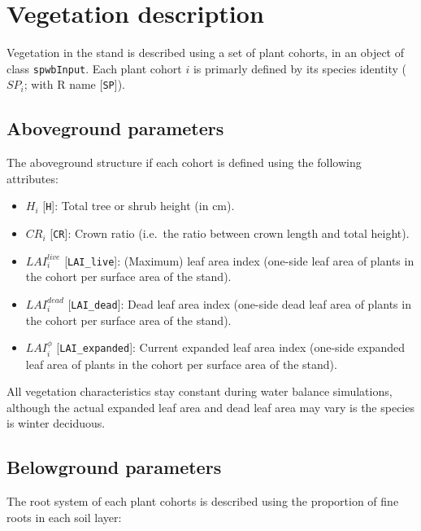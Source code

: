 \documentclass[]{book}
\providecommand{\tightlist}{%
  \setlength{\itemsep}{0pt}\setlength{\parskip}{0pt}}
\begin{document}
\hypertarget{vegetation-description}{%
\section{Vegetation description}\label{vegetation-description}}

Vegetation in the stand is described using a set of plant cohorts, in an object
of class \texttt{spwbInput}. Each plant cohort \(i\) is primarly defined by its
species identity (\(SP_i\); with R name {[}\texttt{SP}{]}).

\hypertarget{aboveground-parameters}{%
\subsection{Aboveground parameters}\label{aboveground-parameters}}

The aboveground structure if each cohort is defined using the following attributes:

\begin{itemize}
\tightlist
\item
  \(H_i\) {[}\texttt{H}{]}: Total tree or shrub height (in cm).
\item
  \(CR_i\) {[}\texttt{CR}{]}: Crown ratio (i.e.~the ratio between crown length and
  total height).
\item
  \(LAI^{live}_i\) {[}\texttt{LAI\_live}{]}: (Maximum) leaf area index (one-side
  leaf area of plants in the cohort per surface area of the stand).
\item
  \(LAI^{dead}_i\) {[}\texttt{LAI\_dead}{]}: Dead leaf area index (one-side dead
  leaf area of plants in the cohort per surface area of the stand).
\item
  \(LAI^{\phi}_i\) {[}\texttt{LAI\_expanded}{]}: Current expanded leaf area index (one-side expanded
  leaf area of plants in the cohort per surface area of the stand).
\end{itemize}

All vegetation characteristics stay constant during water balance simulations, although the actual expanded leaf area and dead leaf area may vary is the species is winter deciduous.

\hypertarget{belowground-parameters}{%
\subsection{Belowground parameters}\label{belowground-parameters}}

The root system of each plant cohorts is described using the proportion of fine
roots in each soil layer:
\end{document}
